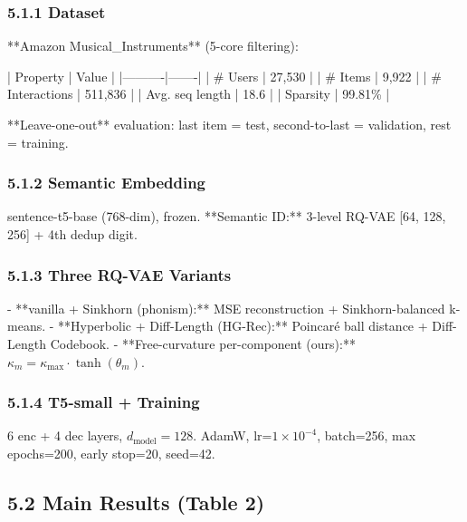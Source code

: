 \documentclass[11pt]{article}
\begin{document}
\subsubsection{5.1.1 Dataset}

**Amazon Musical\_Instruments** (5-core filtering):

| Property | Value |
|----------|-------|
| \# Users | 27,530 |
| \# Items | 9,922 |
| \# Interactions | 511,836 |
| Avg. seq length | 18.6 |
| Sparsity | 99.81\% |

**Leave-one-out** evaluation: last item = test, second-to-last = validation, rest = training.


\subsubsection{5.1.2 Semantic Embedding}
sentence-t5-base (768-dim), frozen. **Semantic ID:** 3-level RQ-VAE [64, 128, 256] + 4th dedup digit.


\subsubsection{5.1.3 Three RQ-VAE Variants}
- **vanilla + Sinkhorn (phonism):** MSE reconstruction + Sinkhorn-balanced k-means.
- **Hyperbolic + Diff-Length (HG-Rec):** Poincaré ball distance + Diff-Length Codebook.
- **Free-curvature per-component (ours):** $\kappa_m = \kappa_{\max} \cdot \tanh(\theta_m)$.


\subsubsection{5.1.4 T5-small + Training}
6 enc + 4 dec layers, $d_{\text{model}}=128$. AdamW, lr=$1 \times 10^{-4}$, batch=256, max epochs=200, early stop=20, seed=42.


\subsection{5.2 Main Results (Table 2)}
\end{document}

